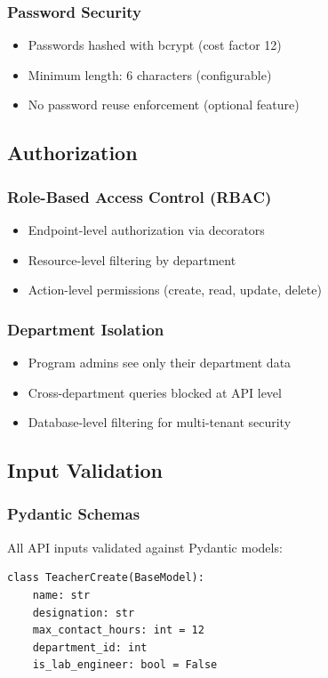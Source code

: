 \documentclass[12pt,a4paper]{article}
\begin{document}
\subsubsection{Password Security}
\begin{itemize}
    \item Passwords hashed with bcrypt (cost factor 12)
    \item Minimum length: 6 characters (configurable)
    \item No password reuse enforcement (optional feature)
\end{itemize}

\subsection{Authorization}

\subsubsection{Role-Based Access Control (RBAC)}
\begin{itemize}
    \item Endpoint-level authorization via decorators
    \item Resource-level filtering by department
    \item Action-level permissions (create, read, update, delete)
\end{itemize}

\subsubsection{Department Isolation}
\begin{itemize}
    \item Program admins see only their department data
    \item Cross-department queries blocked at API level
    \item Database-level filtering for multi-tenant security
\end{itemize}

\subsection{Input Validation}

\subsubsection{Pydantic Schemas}
All API inputs validated against Pydantic models:
\begin{verbatim}
class TeacherCreate(BaseModel):
    name: str
    designation: str
    max_contact_hours: int = 12
    department_id: int
    is_lab_engineer: bool = False
\end{verbatim}
\end{document}
